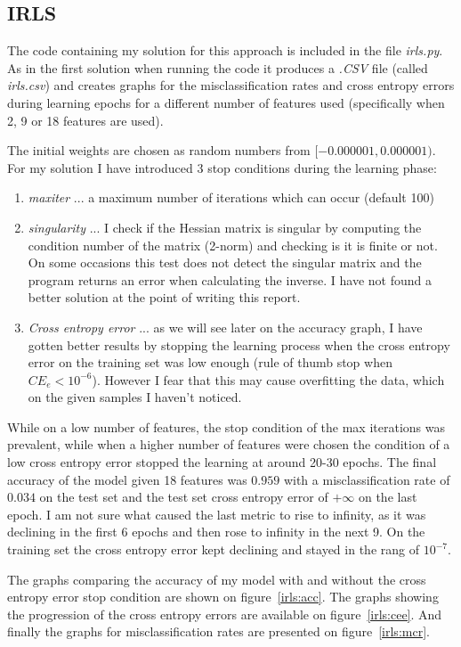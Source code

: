\documentclass[a4paper,11pt]{article}
\begin{document}
\subsection{IRLS}

The code containing my solution for this approach is included in the file \textit{irls.py}. As in the first solution when running the code it produces a \textit{.CSV} file (called \textit{irls.csv}) and creates graphs for the misclassification rates and cross entropy errors during learning epochs for a different number of features used (specifically when 2, 9 or 18 features are used).

The initial weights are chosen as random numbers from $[-0.000001, 0.000001)$. For my solution I have introduced 3 stop conditions during the learning phase:
\begin{enumerate}
 \item \textit{maxiter} ... a maximum number of iterations which can occur (default 100)
 \item \textit{singularity} ... I check if the Hessian matrix is singular by computing the condition number of the matrix (2-norm) and checking is it is finite or not. On some occasions this test does not detect the singular matrix and the program returns an error when calculating the inverse. I have not found a better solution at the point of writing this report.
 \item \textit{Cross entropy error} ... as we will see later on the accuracy graph, I have gotten better results by stopping the learning process when the cross entropy error on the training set was low enough (rule of thumb stop when $CE_e<10^{-6}$). However I fear that this may cause overfitting the data, which on the given samples I haven't noticed.
\end{enumerate}
While on a low number of features, the stop condition of the max iterations was prevalent, while when a higher number of features were chosen the condition of a low cross entropy error stopped the learning at around 20-30 epochs.
The final accuracy of the model given 18 features was $0.959$ with a misclassification rate of $0.034$ on the test set and the test set cross entropy error of $+\infty$ on the last epoch. I am not sure what caused the last metric to rise to infinity, as it was declining in the first 6 epochs and then rose to infinity in the next 9. On the training set the cross entropy error kept declining and stayed in the rang of $10^{-7}$.

The graphs comparing the accuracy of my model with and without the cross entropy error stop condition are shown on figure~\ref{irls:acc}. The graphs showing the progression of the cross entropy errors are available on figure~\ref{irls:cee}. And finally the graphs for misclassification rates are presented on figure~\ref{irls:mcr}.
\end{document}
